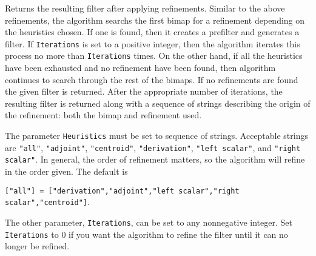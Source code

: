 \documentclass{amsart}
\begin{document}
Returns the resulting filter after applying refinements.
Similar to the above refinements, the algorithm searchs the first bimap for a refinement depending on the heuristics chosen. 
If one is found, then it creates a prefilter and generates a filter.
If {\tt Iterations} is set to a positive integer, then the algorithm iterates this process no more than {\tt Iterations} times.
On the other hand, if all the heuristics have been exhausted and no refinement have been found, then algorithm continues to search through the rest of the bimaps. 
If no refinements are found the given filter is returned.
After the appropriate number of iterations, the resulting filter is returned along with a sequence of strings describing the origin of the refinement: both the bimap and refinement used.

The parameter {\tt Heuristics} must be set to sequence of strings. 
Acceptable strings are {\tt "all"}, {\tt "adjoint"}, {\tt "centroid"}, {\tt "derivation"}, {\tt "left scalar"}, and {\tt "right scalar"}.
In general, the order of refinement matters, so the algorithm will refine in the order given. 
The default is
\begin{center}{\small
{\tt ["all"] = ["derivation","adjoint","left scalar","right scalar","centroid"]}.
}
\end{center}
The other parameter, {\tt Iterations}, can be set to any nonnegative integer. 
Set {\tt Iterations} to $0$ if you want the algorithm to refine the filter until it can no longer be refined.
\end{document}
